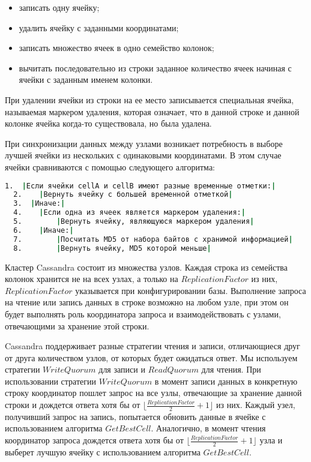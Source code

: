 \begin{itemize}
	\item записать одну ячейку;
	\item удалить ячейку с заданными координатами;
	\item записать множество ячеек в одно семейство колонок;
	\item вычитать последовательно из строки заданное количество ячеек начиная с ячейки с заданным именем колонки.
\end{itemize}

При удалении ячейки из строки на ее место записывается специальная ячейка, называемая маркером удаления, которая означает, что в данной строке и данной колонке ячейка когда-то существовала, но была удалена.

При синхронизации данных между узлами возникает потребность в выборе лучшей ячейки из нескольких с одинаковыми координатами. В этом случае ячейки сравниваются с помощью следующего алгоритма:
\begin{lstlisting}[language=csh,caption={Алгоритм GetBestCell(cellA, cellB)}]
  1.  |Если ячейки cellA и cellB имеют разные временные отметки:|
  2.  	|Вернуть ячейку с большей временной отметкой|
  3.  |Иначе:|
  4.  	|Если одна из ячеек является маркером удаления:|
  5.  		|Вернуть ячейку, являющуюся маркером удаления|
  6.  	|Иначе:|
  7.  		|Посчитать MD5 от набора байтов с хранимой информацией|
  8.  		|Вернуть ячейку, MD5 которой меньше|
\end{lstlisting}

Кластер Cassandra состоит из множества узлов. Каждая строка из семейства колонок хранится не на всех узлах, а только на $ReplicationFactor$ из них, $ReplicationFactor$ указывается при конфигурировании базы. Выполнение запроса на чтение или запись данных в строке возможно на любом узле, при этом он будет выполнять роль координатора запроса и взаимодействовать с узлами, отвечающими за хранение этой строки.

Cassandra поддерживает разные стратегии чтения и записи, отличающиеся друг от друга количеством узлов, от которых будет ожидаться ответ. Мы используем стратегии $WriteQuorum$ для записи и $ReadQuorum$ для чтения. При использовании стратегии $WriteQuorum$ в момент записи данных в конкретную строку координатор пошлет запрос на все узлы, отвечающие за хранение данной строки и дождется ответа хотя бы от $\lfloor \frac{ReplicationFactor}{2} + 1\rfloor$ из них. Каждый узел, получивший запрос на запись, попытается обновить данные в ячейке с использованием алгоритма $GetBestCell$.
Аналогично, в момент чтения координатор запроса дождется ответа хотя бы от $\lfloor \frac{ReplicationFactor}{2} + 1\rfloor$ узла и выберет лучшую ячейку с использованием алгоритма $GetBestCell$.

